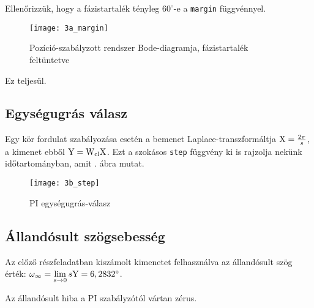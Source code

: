 Ellenőrizzük, hogy a fázistartalék tényleg $60^\circ$-e a \verb|margin| függvénnyel.
\begin{figure}[H]
	\centering
	\texttt{[image: 3a\_margin]}
	\caption{Pozíció-szabályzott rendszer Bode-diagramja, fázistartalék feltüntetve}
	\label{fig:3a_margin}
\end{figure}

Ez teljesül.


\subsection{Egységugrás válasz}

Egy kör fordulat szabályozása esetén a bemenet Laplace-transzformáltja $\mathrm{X}=\frac{2\pi}{s}$,
a kimenet ebből $\mathrm{Y} = \mathrm{W}_\text{cl}\mathrm{X}$. Ezt a szokásos \verb|step| függvény
ki is rajzolja nekünk időtartományban, amit . ábra mutat.

\begin{figure}[H]
	\centering
	\texttt{[image: 3b\_step]}
	\caption{PI egységugrás-válasz}
	\label{fig:3b_step}
\end{figure}


\subsection{Állandósult szögsebesség}

Az előző részfeladatban kiszámolt kimenetet felhasználva az állandósult szög érték:
$\omega_\infty = \lim\limits_{s\rightarrow 0}s\mathrm{Y} = 6,2832^\circ$.

Az állandósult hiba a PI szabályzótól vártan zérus.

